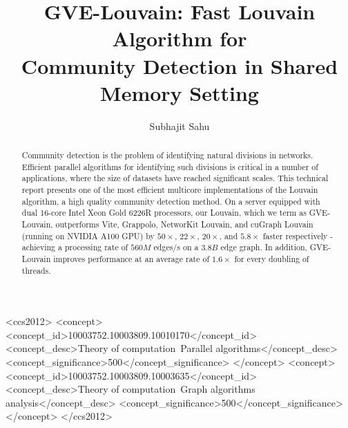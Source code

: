 \documentclass[sigconf,nonacm]{acmart}
\begin{document}
\title[GVE-Louvain: Fast Louvain Algorithm for Community Detection in Shared Memory Setting]{GVE-Louvain: Fast Louvain Algorithm for\\Community Detection in Shared Memory Setting}


\author{Subhajit Sahu}



\begin{abstract}
Community detection is the problem of identifying natural divisions in networks. Efficient parallel algorithms for identifying such divisions is critical in a number of applications, where the size of datasets have reached significant scales. This technical report presents one of the most efficient multicore implementations of the Louvain algorithm, a high quality community detection method. On a server equipped with dual 16-core Intel Xeon Gold 6226R processors, our Louvain, which we term as GVE-Louvain, outperforms Vite, Grappolo, NetworKit Louvain, and cuGraph Louvain (running on NVIDIA A100 GPU) by $50\times$, $22\times$, $20\times$, and $5.8\times$ faster respectively - achieving a processing rate of $560 M$ edges/s on a $3.8 B$ edge graph. In addition, GVE-Louvain improves performance at an average rate of $1.6\times$ for every doubling of threads.
\end{abstract}

\begin{CCSXML}
<ccs2012>
<concept>
<concept_id>10003752.10003809.10010170</concept_id>
<concept_desc>Theory of computation~Parallel algorithms</concept_desc>
<concept_significance>500</concept_significance>
</concept>
<concept>
<concept_id>10003752.10003809.10003635</concept_id>
<concept_desc>Theory of computation~Graph algorithms analysis</concept_desc>
<concept_significance>500</concept_significance>
</concept>
</ccs2012>
\end{CCSXML}
\end{document}
